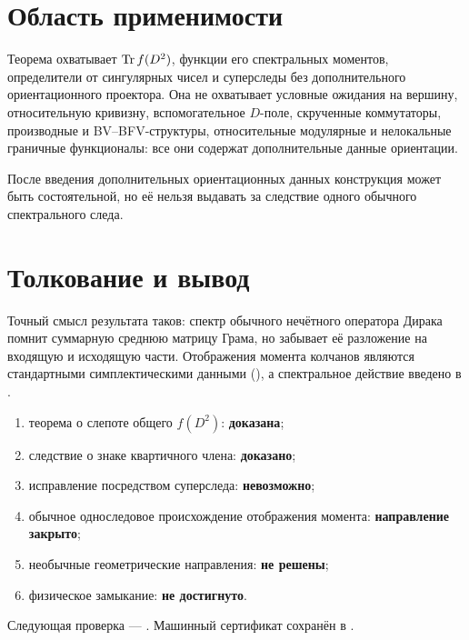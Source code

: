 \section{Область применимости}

Теорема охватывает \(\operatorname{Tr} f(D^2)\), функции его спектральных моментов,
определители от сингулярных чисел и суперследы без дополнительного
ориентационного проектора. Она не охватывает условные ожидания на вершину,
относительную кривизну, вспомогательное \(D\)-поле, скрученные коммутаторы,
производные и BV--BFV-структуры, относительные модулярные и нелокальные
граничные функционалы: все они содержат дополнительные данные ориентации.

\begin{nogocriterion}
После введения дополнительных ориентационных данных конструкция может быть
состоятельной, но её нельзя выдавать за следствие одного обычного
спектрального следа.
\end{nogocriterion}

\section{Толкование и вывод}

Точный смысл результата таков: спектр обычного нечётного оператора Дирака
помнит суммарную среднюю матрицу Грама, но забывает её разложение на входящую
и исходящую части. Отображения момента колчанов являются стандартными
симплектическими данными (), а спектральное действие
введено в .

\begin{protocol}
\begin{enumerate}
 \item теорема о слепоте общего \(f(D^2)\): \textbf{доказана};
 \item следствие о знаке квартичного члена: \textbf{доказано};
 \item исправление посредством суперследа: \textbf{невозможно};
 \item обычное односледовое происхождение отображения момента:
 \textbf{направление закрыто};
 \item необычные геометрические направления: \textbf{не решены};
 \item физическое замыкание: \textbf{не достигнуто}.
\end{enumerate}
\end{protocol}

Следующая проверка --- .
Машинный сертификат сохранён в
.